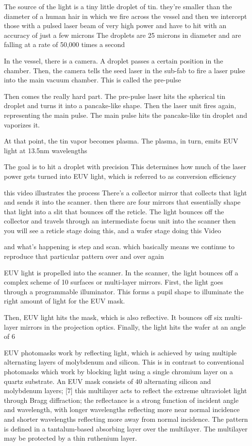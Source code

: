 \documentclass[12pt,a4paper]{report}
\begin{document}
The source of the light is a tiny little droplet of tin.
 they're smaller than 
the diameter of a human hair in which we fire 
across the vessel and then we intercept those 
with a pulsed laser 
beam of very high power and have to hit with 
an accuracy of just a few microns
The droplets are 25 microns in diameter and 
are falling at a rate of 50,000 times a second


In the vessel, there is a camera. A droplet 
passes a certain position in the chamber. 
Then, the camera tells the seed laser in the 
sub-fab to fire a laser pulse into the main 
vacuum chamber. This is called the pre-pulse

Then comes the really hard part. The pre-pulse 
laser hits the spherical tin droplet and turns 
it into a pancake-like shape. Then the laser 
unit fires again, representing the main pulse. 
The main pulse hits the pancake-like tin droplet
 and vaporizes it.


At that point, the tin vapor becomes plasma. 
The plasma, in turn, emits EUV light at 13.5nm 
wavelengths

The goal is to hit a droplet with precision
This determines how much of the laser power 
gets turned into EUV light, 
which is referred to as conversion efficiency

this {video illustrates the process}
There's a collector mirror that collects that light
and sends it into the scanner. then there are 
four mirrors that essentially shape that light 
into a slit that
bounces off the reticle.
The light bounces off the collector and travels 
through an intermediate focus unit into the scanner
then you will see a reticle stage doing this, 
and a wafer stage doing this {Video}

and what's  happening is step and scan. which 
basically means we continue to reproduce that 
particular pattern
over and over again

EUV light is propelled into the scanner. In the 
scanner, the light bounces off a complex scheme 
of 10 surfaces or multi-layer mirrors. First, 
the light goes through a programmable illuminator. 
This forms 
a pupil shape to illuminate the right amount of 
light for the EUV mask.

Then, EUV light hits the mask, which is also 
reflective. It bounces off six multi-layer 
mirrors in the
projection optics. Finally, the light hits 
the wafer at an angle of 6%

EUV photomasks work by reflecting light, which is 
achieved by using multiple alternating layers of 
molybdenum and silicon. 
This is in contrast to conventional photomasks 
which work by blocking light using a single 
chromium layer on a quartz substrate. An EUV mask 
consists of 40 alternating silicon and molybdenum 
layers;
[7] this multilayer acts to reflect the extreme 
ultraviolet light through Bragg diffraction; 
the reflectance is a strong function of incident 
angle and wavelength, with longer wavelengths 
reflecting more near normal incidence and shorter 
wavelengths reflecting more away from normal incidence. 
The pattern is defined in a tantalum-based 
absorbing layer over the multilayer.
 The multilayer 
may be protected by a thin ruthenium layer.
\end{document}
